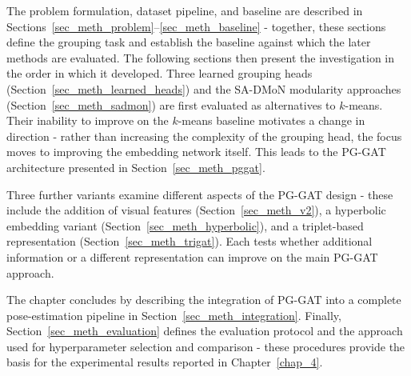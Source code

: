 The problem formulation, dataset pipeline, and baseline
are described in Sections~\ref{sec_meth_problem}--\ref{sec_meth_baseline} -
together, these sections define the grouping task
and establish the baseline against which the later methods are evaluated.
The following sections then present the investigation in the order in which it developed.
Three learned grouping heads (Section~\ref{sec_meth_learned_heads})
and the SA-DMoN modularity approaches (Section~\ref{sec_meth_sadmon})
are first evaluated as alternatives to $k$-means.
Their inability to improve on the $k$-means baseline motivates a change in direction -
rather than increasing the complexity of the grouping head,
the focus moves to improving the embedding network itself.
This leads to the PG-GAT architecture presented in Section~\ref{sec_meth_pggat}.

Three further variants examine different aspects of the PG-GAT design -
these include the addition of visual features (Section~\ref{sec_meth_v2}),
a hyperbolic embedding variant (Section~\ref{sec_meth_hyperbolic}),
and a triplet-based representation (Section~\ref{sec_meth_trigat}).
Each tests whether additional information or a different representation can improve on the main PG-GAT approach.

The chapter concludes by describing the integration of PG-GAT
into a complete pose-estimation pipeline in Section~\ref{sec_meth_integration}.
Finally, Section~\ref{sec_meth_evaluation} defines the evaluation protocol
and the approach used for hyperparameter selection and comparison -
these procedures provide the basis for the experimental results reported in Chapter~\ref{chap_4}.
















